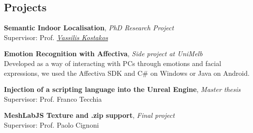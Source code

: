 \documentclass[margin]{res}
\begin{document}
\begin{resume}
\section{Projects}
\textbf{Semantic Indoor Localisation}, \textit{PhD Research Project}\\
Supervisor: Prof. \textit{\href{https://people.eng.unimelb.edu.au/vkostakos/}{Vassilis Kostakos}}

\textbf{Emotion Recognition with Affectiva}, \textit{Side project at UniMelb}\\
Developed as a way of interacting with PCs through emotions and facial expressions, we used the Affectiva SDK and C\# on Windows or Java on Android.

\textbf{Injection of a scripting language into the Unreal Engine}, \textit{Master thesis}\\
Supervisor: Prof. Franco Tecchia


\textbf{MeshLabJS Texture and .zip support}, \textit{Final project}\\
Supervisor: Prof. Paolo Cignoni


\end{resume}
\end{document}
